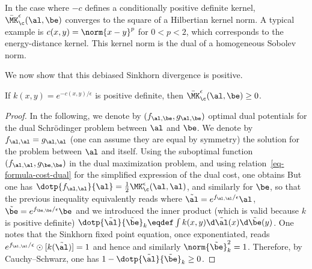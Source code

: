 	In the case where $-c$ defines a conditionally positive definite kernel, $\bar\MK_\c^\epsilon(\al,\be)$ converges to the square of a Hilbertian kernel norm. A typical example is $c(x,y)=\norm{x-y}^p$ for $0 < p < 2$, which corresponds to the energy-distance kernel. This kernel norm is the dual of a homogeneous Sobolev norm.

We now show that this debiased Sinkhorn divergence is positive.

\begin{prop}\label{prop-sinkhorn-positive}
	If $k(x,y)=e^{-c(x,y)/\epsilon}$ is positive definite, then $\bar\MK_\c^\epsilon(\al,\be) \geq 0$.
\end{prop}

\begin{proof}
	In the following, we denote by $(f_{\al,\be},g_{\al,\be})$ optimal dual potentials for the
	dual Schr\"odinger problem between $\al$ and $\be$.
	We denote by $f_{\al,\al}=g_{\al,\al}$ (one can assume they are equal by symmetry) the solution for the problem between $\al$ and itself.
	Using the suboptimal function $(f_{\al,\al},g_{\be,\be})$ in the dual maximization problem, and using relation~\eqref{eq-formula-cost-dual} for the simplified expression of the dual cost, one obtains
	But one has $\dotp{f_{\al,\al}}{\al} = \frac{1}{2}\MK_\c^\epsilon(\al,\al)$, and similarly for $\be$, so that the previous inequality equivalently reads
		where $\tilde\al=e^{f_{\al,\al}/\epsilon} \al$, $\tilde\be=e^{f_{\be,\be}/\epsilon} \be$
		and we introduced the inner product (which is valid because $k$ is positive definite)
	$\dotp{\tilde\al}{\tilde\be}_{k} \eqdef \int k(x,y) \d\tilde\al(x) \d\tilde\be(y)$.
	One notes that the Sinkhorn fixed point equation, once exponentiated, reads
	$e^{f_{\al,\al}/\epsilon} \odot [ k( \tilde \al ) ] = 1$ and hence
		and similarly $\norm{\tilde \be}_k^2=1$. Therefore, by Cauchy--Schwarz, one has
	$1 - \dotp{\tilde\al}{\tilde\be}_{k} \geq 0$.
\end{proof}

